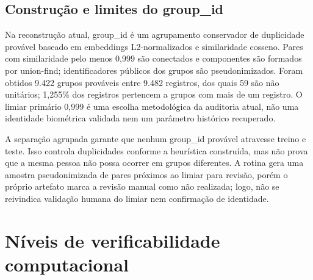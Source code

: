 \subsection{Construção e limites do group\_id}

Na reconstrução atual, group\_id é um agrupamento conservador de duplicidade provável baseado em embeddings L2-normalizados e similaridade cosseno. Pares com similaridade pelo menos 0,999 são conectados e componentes são formados por union-find; identificadores públicos dos grupos são pseudonimizados. Foram obtidos 9.422 grupos prováveis entre 9.482 registros, dos quais 59 são não unitários; 1,255\% dos registros pertencem a grupos com mais de um registro. O limiar primário 0,999 é uma escolha metodológica da auditoria atual, não uma identidade biométrica validada nem um parâmetro histórico recuperado.

A separação agrupada garante que nenhum group\_id provável atravesse treino e teste. Isso controla duplicidades conforme a heurística construída, mas não prova que a mesma pessoa não possa ocorrer em grupos diferentes. A rotina gera uma amostra pseudonimizada de pares próximos ao limiar para revisão, porém o próprio artefato marca a revisão manual como não realizada; logo, não se reivindica validação humana do limiar nem confirmação de identidade.

\section{Níveis de verificabilidade computacional}


